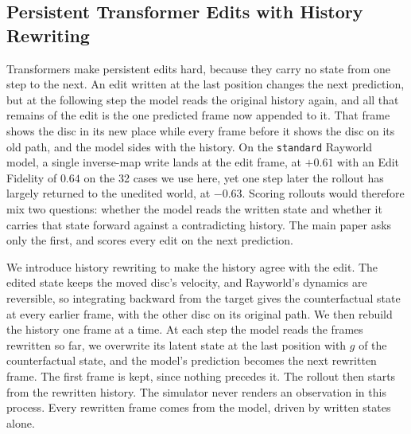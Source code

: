 \documentclass{article} %
\begin{document}
\FloatBarrier
\subsection{Persistent Transformer Edits with History Rewriting}
\label{app:history_editing}

Transformers make persistent edits hard, because they carry no state from one step to the next. An edit written at the last position changes the next prediction, but at the following step the model reads the original history again, and all that remains of the edit is the one predicted frame now appended to it. That frame shows the disc in its new place while every frame before it shows the disc on its old path, and the model sides with the history. On the \texttt{standard} Rayworld model, a single inverse-map write lands at the edit frame, at $+0.61$ with an Edit Fidelity of $0.64$ on the 32 cases we use here, yet one step later the rollout has largely returned to the unedited world, at $-0.63$. Scoring rollouts would therefore mix two questions: whether the model reads the written state and whether it carries that state forward against a contradicting history. The main paper asks only the first, and scores every edit on the next prediction.

We introduce history rewriting to make the history agree with the edit. The edited state keeps the moved disc's velocity, and Rayworld's dynamics are reversible, so integrating backward from the target gives the counterfactual state at every earlier frame, with the other disc on its original path. We then rebuild the history one frame at a time. At each step the model reads the frames rewritten so far, we overwrite its latent state at the last position with $g$ of the counterfactual state, and the model's prediction becomes the next rewritten frame. The first frame is kept, since nothing precedes it. The rollout then starts from the rewritten history. The simulator never renders an observation in this process. Every rewritten frame comes from the model, driven by written states alone. 
\end{document}
